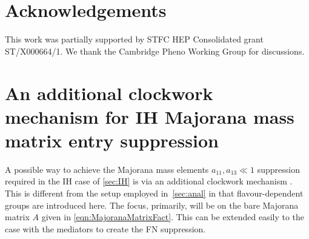 \documentclass[11pt,letterpaper]{article}
\begin{document}
\section*{Acknowledgements}
This work was partially supported by STFC HEP Consolidated grant
ST/X000664/1. We thank the Cambridge Pheno Working Group for discussions. 

\appendix
\section{An additional clockwork mechanism for IH Majorana mass matrix entry suppression} \label{Sec:Clockwork}
A possible way to achieve the Majorana mass elements $a_{11},a_{13} \ll 1$
suppression required in the IH case of 
\cref{sec:IH} is via an additional clockwork mechanism
\cite{Kaplan:2015fuy,Giudice:2016yja,Choi:2015fiu}. This is different from the
setup employed in~\cref{sec:anal} in that flavour-dependent groups are introduced here.
The focus, primarily, will be on the bare Majorana matrix $A$ given in \cref{eqn:MajoranaMatrixFact}. This can be extended easily to the case with the mediators to create the FN suppression. 
\end{document}
